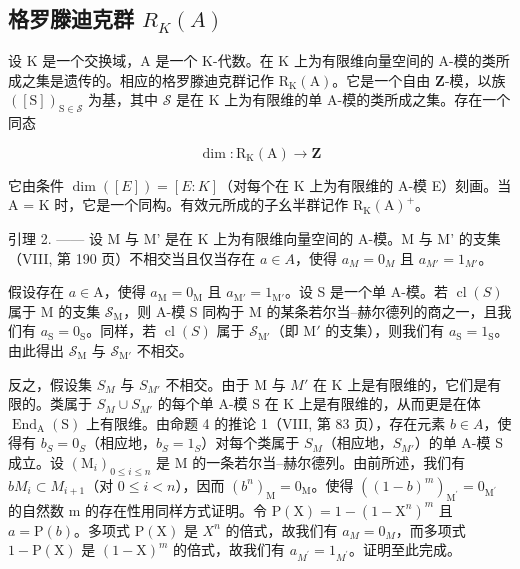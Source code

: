\subsection{\texorpdfstring{格罗滕迪克群 \(R_{K}(A)\)}{格罗滕迪克群 R\_\{K\}(A)}}

设 \(\mathrm{K}\) 是一个交换域，\(\mathrm{A}\) 是一个 \(\mathrm{K}\)-代数。在 \(\mathrm{K}\) 上为有限维向量空间的 A-模的类所成之集是遗传的。相应的格罗滕迪克群记作 \(\mathrm{R}_{\mathrm{K}}(\mathrm{A})\)。它是一个自由 \(\mathbf{Z}\)-模，以族 \(([\mathrm{S}])_{\mathrm{S}\in \mathcal{S}}\) 为基，其中 \(\mathcal{S}\) 是在 \(\mathrm{K}\) 上为有限维的单 A-模的类所成之集。存在一个同态

\[
\dim : \mathrm{R} _ {\mathrm{K}} (\mathrm{A}) \longrightarrow \mathbf {Z}
\]

它由条件 \(\dim([E]) = [E : K]\)（对每个在 K 上为有限维的 A-模 E）刻画。当 A = K 时，它是一个同构。有效元所成的子幺半群记作 \(\mathrm{R}_{\mathrm{K}}(\mathrm{A})^{+}\)。

引理 2. —— 设 M 与 M' 是在 K 上为有限维向量空间的 A-模。M 与 M' 的支集（VIII, 第 190 页）不相交当且仅当存在 \(a \in A\)，使得 \(a_{M} = 0_{M}\) 且 \(a_{M'} = 1_{M'}\)。

假设存在 \(a \in \mathrm{A}\)，使得 \(a_{\mathrm{M}} = 0_{\mathrm{M}}\) 且 \(a_{\mathrm{M}'} = 1_{\mathrm{M}'}\)。设 S 是一个单 A-模。若 \(\operatorname{cl}(S)\) 属于 M 的支集 \(\mathcal{S}_{\mathrm{M}}\)，则 A-模 S 同构于 M 的某条若尔当–赫尔德列的商之一，且我们有 \(a_{\mathrm{S}} = 0_{\mathrm{S}}\)。同样，若 \(\operatorname{cl}(S)\) 属于 \(\mathcal{S}_{\mathrm{M}'}\)（即 \(\mathrm{M}'\) 的支集），则我们有 \(a_{\mathrm{S}} = 1_{\mathrm{S}}\)。由此得出 \(\mathcal{S}_{\mathrm{M}}\) 与 \(\mathcal{S}_{\mathrm{M}'}\) 不相交。

反之，假设集 \(S_{M}\) 与 \(S_{M'}\) 不相交。由于 M 与 \(M'\) 在 K 上是有限维的，它们是有限的。类属于 \(S_{M} \cup S_{M'}\) 的每个单 A-模 S 在 K 上是有限维的，从而更是在体 \(\operatorname{End}_{\mathrm{A}}(\mathrm{S})\) 上有限维。由命题 4 的推论 1（VIII, 第 83 页），存在元素 \(b \in A\)，使得有 \(b_{S} = 0_{S}\)（相应地，\(b_{S} = 1_{S}\)）对每个类属于 \(S_{M}\)（相应地，\(S_{M'}\)）的单 A-模 S 成立。设 \((\mathrm{M}_{i})_{0 \leqslant i \leqslant n}\) 是 M 的一条若尔当–赫尔德列。由前所述，我们有 \(bM_{i} \subset M_{i+1}\)（对 \(0 \leqslant i < n\)），因而 \((b^{n})_{\mathrm{M}} = 0_{\mathrm{M}}\)。使得 \(((1-b)^{m})_{\mathrm{M}^{\prime}}=0_{\mathrm{M}^{\prime}}\) 的自然数 m 的存在性用同样方式证明。令 \(\mathrm{P}(\mathrm{X})=1-(1-\mathrm{X}^{n})^{m}\) 且 \(a=\mathrm{P}(b)\)。多项式 \(\mathrm{P}(\mathrm{X})\) 是 \(X^{n}\) 的倍式，故我们有 \(a_{M}=0_{M}\)，而多项式 \(1-\mathrm{P}(\mathrm{X})\) 是 \((1-\mathrm{X})^{m}\) 的倍式，故我们有 \(a_{M^{\prime}}=1_{M^{\prime}}\)。证明至此完成。

